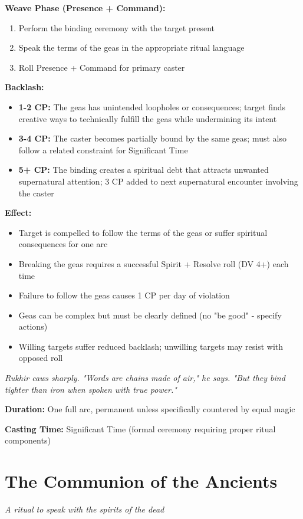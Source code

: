 \documentclass[12pt,twoside]{book}
\newcommand{\shadow}[1]{\textit{#1}}
\begin{document}
\textbf{Weave Phase (Presence + Command):}
\begin{enumerate}
\item Perform the binding ceremony with the target present
\item Speak the terms of the geas in the appropriate ritual language
\item Roll Presence + Command for primary caster
\end{enumerate}

\textbf{Backlash:}
\begin{itemize}
\item \textbf{1-2 CP:} The geas has unintended loopholes or consequences; target finds creative ways to technically fulfill the geas while undermining its intent
\item \textbf{3-4 CP:} The caster becomes partially bound by the same geas; must also follow a related constraint for Significant Time
\item \textbf{5+ CP:} The binding creates a spiritual debt that attracts unwanted supernatural attention; 3 CP added to next supernatural encounter involving the caster
\end{itemize}

\textbf{Effect:}
\begin{itemize}
\item Target is compelled to follow the terms of the geas or suffer spiritual consequences for one arc
\item Breaking the geas requires a successful Spirit + Resolve roll (DV 4+) each time
\item Failure to follow the geas causes 1 CP per day of violation
\item Geas can be complex but must be clearly defined (no "be good" - specify actions)
\item Willing targets suffer reduced backlash; unwilling targets may resist with opposed roll
\end{itemize}

\shadow{Rukhir caws sharply. "Words are chains made of air," he says. "But they bind tighter than iron when spoken with true power."}

\textbf{Duration:} One full arc, permanent unless specifically countered by equal magic

\textbf{Casting Time:} Significant Time (formal ceremony requiring proper ritual components)

\section*{The Communion of the Ancients}
\textit{A ritual to speak with the spirits of the dead}
\end{document}
